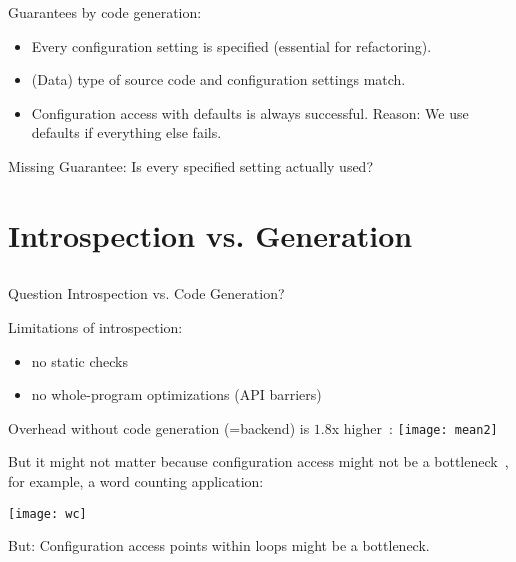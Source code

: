 \begin{frame}
	Guarantees by code generation:
	\begin{itemize}
	\item Every configuration setting is specified (essential for refactoring).
	\item (Data) type of source code and configuration settings match.
	\item Configuration access with defaults is always successful.
	Reason: We use defaults if everything else fails.
	\end{itemize}
	\vspace{3em}
	Missing Guarantee: Is every specified setting actually used?
\end{frame}



\section{Introspection vs. Generation}

\subsection{}

\begin{frame}
	\begin{alertblock}{Question}
	Introspection vs. Code Generation?
	\end{alertblock}
\end{frame}

\begin{frame}
	Limitations of introspection:
	\begin{itemize}
	\item no static checks
	\item no whole-program optimizations (API barriers)
	\end{itemize}
\end{frame}

\begin{frame}
	Overhead without code generation (=backend) is $1.8$x higher~\cite{raab2015kps}:
	\texttt{[image: mean2]}
\end{frame}

\begin{frame}
	But it might not matter because configuration access might not be a bottleneck~\cite{raab2015kps},
	for example, a word counting application:

	\texttt{[image: wc]}

	But: \pause
	Configuration access points within loops might be a bottleneck.
\end{frame}

